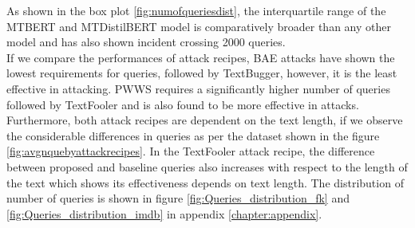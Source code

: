 \documentclass[%
	BCOR=8mm, %
	DIV=12,
	toc=bibliography, %
	toc=listof, %
	oneside, %
	egregdoesnotlikesansseriftitles, %
	]{scrbook}
\begin{document}
 As shown in the box plot \ref{fig:numofqueriesdist}, the interquartile range of the MTBERT and MTDistilBERT model is comparatively broader than any other model and has also shown incident crossing 2000 queries. \\
If we compare the performances of attack recipes, BAE attacks have shown the lowest requirements for queries, followed by TextBugger, however, it is the least effective in attacking. PWWS requires a significantly higher number of queries followed by TextFooler and is also found to be more effective in attacks. \\
Furthermore, both attack recipes are dependent on the text length, if we observe the considerable differences in queries as per the dataset shown in the figure \ref{fig:avgnquebyattackrecipes}. In the TextFooler attack recipe, the difference between proposed and baseline queries also increases with respect to the length of the text which shows its effectiveness depends on text length. The distribution of number of queries is shown in figure \ref{fig:Queries_distribution_fk} and \ref{fig:Queries_distribution_imdb} in appendix \ref{chapter:appendix}.
\end{document}
